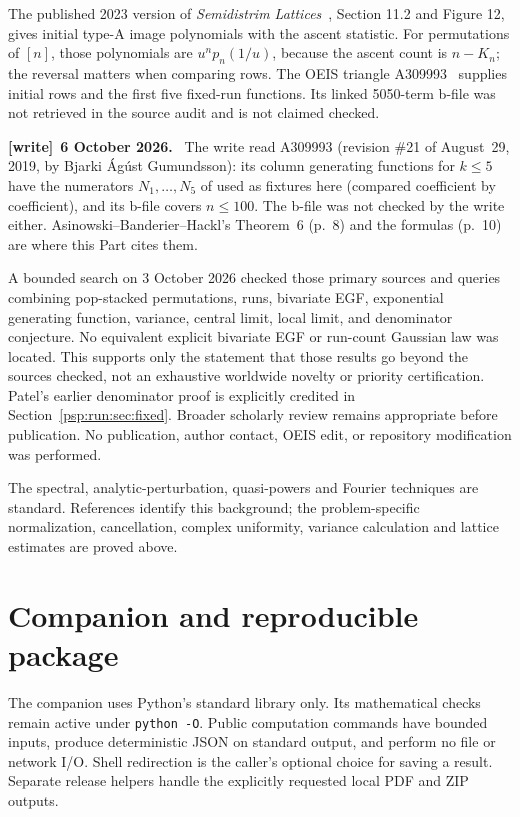 \documentclass[11pt,letterpaper]{article}
\numberwithin{equation}{section}
\theoremstyle{remark}\newtheorem{remark}[theorem]{Remark}
\newenvironment{writenote}[1][]{\par\smallskip\begingroup\small
 \noindent\textbf{[write]}\if\relax\detokenize{#1}\relax\else~\textbf{#1.}\fi\ }%
 {\par\endgroup\smallskip}
\begin{document}
The published 2023 version of \emph{Semidistrim Lattices}~\cite{dw},
Section 11.2 and Figure 12, gives initial type-A image polynomials with
the ascent statistic. For permutations of $[n]$, those polynomials are
$u^np_n(1/u)$, because the ascent count is $n-K_n$; the reversal matters
when comparing rows. The OEIS triangle A309993~\cite{oeisA309993} supplies
initial rows and the first five fixed-run functions. Its linked
5050-term b-file was not retrieved in the source audit and is not
claimed checked.
\begin{writenote}[6 October 2026]
The write read A309993 (revision \#21 of August~29, 2019, by Bjarki \'Ag\'ust Gu\dh mundsson): its column generating functions for $k\le5$ have the numerators $N_1,\dots,N_5$ of \cite[p.~10]{abh} used as fixtures here (compared coefficient by coefficient), and its b-file covers $n\le100$. The b-file was not checked by the write either. Asinowski--Banderier--Hackl's Theorem~6 (p.~8) and the formulas (p.~10) are where this Part cites them.
\end{writenote}

A bounded search on 3 October 2026 checked those primary sources and
queries combining pop-stacked permutations, runs, bivariate EGF,
exponential generating function, variance, central limit, local limit,
and denominator conjecture. No equivalent explicit bivariate EGF or
run-count Gaussian law was located. This supports only the statement
that those results go beyond the sources checked, not an exhaustive
worldwide novelty or priority certification. Patel's earlier denominator
proof is explicitly credited in Section~\ref{psp:run:sec:fixed}. Broader scholarly
review remains appropriate before publication. No publication, author contact, OEIS edit, or repository modification
was performed.

The spectral, analytic-perturbation, quasi-powers and Fourier techniques
are standard. References \cite{ekp,kato,fs} identify this background;
the problem-specific normalization, cancellation, complex uniformity,
variance calculation and lattice estimates are proved above.

\section{Companion and reproducible package}\label{psp:run:sec:package}
The companion uses Python's standard library only. Its mathematical
checks remain active under \texttt{python -O}. Public computation
commands have bounded inputs, produce deterministic JSON on standard
output, and perform no file or network I/O. Shell redirection is the
caller's optional choice for saving a result. Separate release helpers
handle the explicitly requested local PDF and ZIP outputs.
\end{document}
